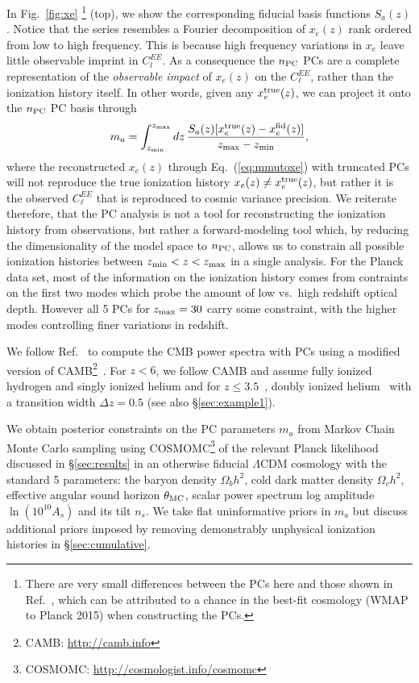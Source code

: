 \documentclass[prd,twocolumn,amsmath,amssymb,floatfix,superscriptaddress,nofootinbib]{revtex4-1}
\newcommand{\xef}{x_e^{\rm fid}}
\newcommand{\zmax}{z_{\rm max}}
\newcommand{\zmin}{z_{\rm min}}
\begin{document}
 
 In Fig.~\ref{fig:xe}
 \footnote{There are very small differences between the PCs here and those shown in Ref.~\cite{Heinrich:2016ojb}, which can be attributed to a chance in the best-fit cosmology (WMAP to Planck 2015) when constructing the PCs.}
 (top), we show the corresponding fiducial basis functions $S_a(z)$.  
Notice that the series resembles a Fourier decomposition of $x_e(z)$ rank ordered from low to high frequency.
This is because high frequency variations in $x_e$ leave little observable imprint in $C_l^{EE}$.  
As a consequence  the $n_{\rm PC}$ PCs are a complete representation of the \textit{observable impact} of $x_e(z)$ on the $C_\ell^{EE}$, rather than the ionization history itself. In other words, 
given any $x_e^{\rm true}(z)$, we can project it onto the $n_{\rm PC}$ PC basis through
\begin{equation}
m_{a}=
  \int _{\zmin}^{\zmax} dz\, \frac{S_{a}(z) [x_e^{\rm true}(z)-\xef(z)]}{\zmax-\zmin},
\label{eq:xetommu}
\end{equation}
%
where the reconstructed $x_e(z)$ through Eq.~(\ref{eq:mmutoxe}) with truncated PCs will not reproduce the true ionization history $x_e(z) \neq x_e^{\rm true}(z)$, but rather it is the observed $C_\ell^{EE}$ that is reproduced to cosmic variance precision. We reiterate therefore, that the PC analysis is not a tool for reconstructing the ionization history from observations, but rather a forward-modeling tool which, by reducing the dimensionality of the model space to $n_{\rm PC}$, allows us to constrain all possible ionization histories between $z_{\rm min}<z<z_{\rm max}$ in a single analysis.
For the Planck data set, most of the information on the ionization history comes from contraints on the first two modes which probe the amount of low vs.\ high redshift optical depth.   However all 5 PCs for $z_{\rm max}=30$ carry some constraint, with the higher modes controlling finer variations in redshift.

We follow Ref.~\cite{Heinrich:2018btc} to compute the CMB power spectra with PCs using a modified version of CAMB\footnote{CAMB: \url{http://camb.info}}~\cite{Lewis:1999bs, Howlett:2012mh}. 
For $z<6$, we follow CAMB and assume fully ionized hydrogen and singly ionized helium and for $z\leq 3.5$~\cite{Becker:2010cu}, doubly ionized helium~\cite{Becker:2010cu} with a transition width $\Delta z = 0.5$ (see also \S \ref{sec:example1}).


We obtain posterior constraints on the PC parameters $m_a$ from Markov Chain Monte Carlo sampling using COSMOMC\footnote{COSMOMC: \url{http://cosmologist.info/cosmomc}} of the relevant Planck likelihood discussed in \S \ref{sec:results} in an otherwise fiducial $\Lambda$CDM cosmology with the standard 5 parameters: the baryon density $\Omega_b h^2$, cold dark matter density 
$\Omega_c h^2$, effective angular sound horizon $\theta_{\rm MC}$, scalar power spectrum log amplitude $\ln (10^{10} A_s)$ and
its tilt $n_s$.  We take flat uninformative
priors in $m_a$ but discuss additional priors imposed by
removing demonstrably  unphysical ionization histories in \S \ref{sec:cumulative}.
\end{document}

